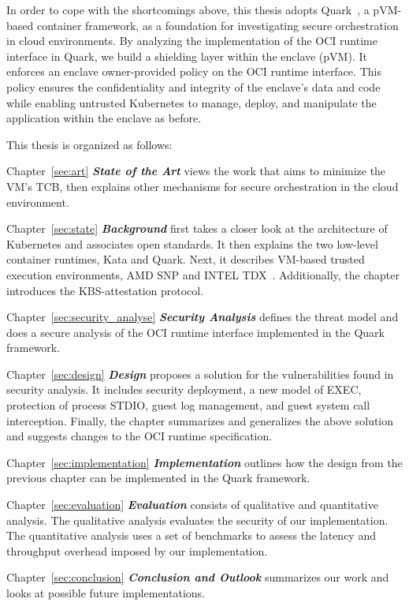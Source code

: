 In order to cope with the shortcomings above, this thesis adopts Quark~\cite*{quark}, a \acrshort{pVM}-based container framework, as a foundation for investigating secure orchestration in cloud environments. By analyzing the implementation of the OCI runtime interface in Quark, we build a shielding layer within the 
enclave (\acrshort{pVM}). It enforces an enclave owner-provided policy on the OCI runtime interface. This policy ensures the confidentiality and integrity of the enclave's data and code while enabling untrusted Kubernetes to manage, deploy, and manipulate the application within the enclave as before.
 
This thesis is organized as follows:

\begin{hangparas}{.25in}{1} 

Chapter~\ref{see:art} \textit{\textbf{State of the Art}} views the work that aims to minimize the VM's TCB, then explains other mechanisms for secure orchestration in the cloud environment. 

Chapter~\ref{sec:state} \textit{\textbf{Background}} first takes a closer look at the architecture of Kubernetes\cite*{k8s} and associates open standards. It then explains the two low-level container runtimes, Kata and Quark. Next, it describes VM-based trusted execution environments, AMD SNP\cite*{SEV_SNP_white_book} and INTEL TDX~\cite*{Intel_tdx_whitepaper}. Additionally, the chapter 
introduces the KBS-attestation protocol.

Chapter~\ref{sec:security_analyse} \textit{\textbf{Security Analysis}} defines the threat model and does a secure analysis of the OCI runtime interface implemented in the Quark framework.

Chapter~\ref{sec:design} \textit{\textbf{Design}} proposes a solution for the vulnerabilities found in security analysis. It includes security deployment, a new model of EXEC, protection of process STDIO, guest log management, and guest system call interception. Finally, the chapter summarizes and generalizes the above solution and suggests changes to the OCI runtime specification.

Chapter~\ref{sec:implementation} \textit{\textbf{Implementation}} outlines how the design from the previous chapter can be implemented in the Quark framework.

Chapter~\ref{sec:evaluation} \textit{\textbf{Evaluation}} consists of qualitative and quantitative analysis. The qualitative analysis evaluates the security of our implementation. The quantitative analysis uses a set of benchmarks to assess the latency and throughput overhead imposed by our implementation.

Chapter~\ref{sec:conclusion} \textit{\textbf{Conclusion and Outlook}} summarizes our work and looks at possible future implementations.

\end{hangparas}

\cleardoublepage

